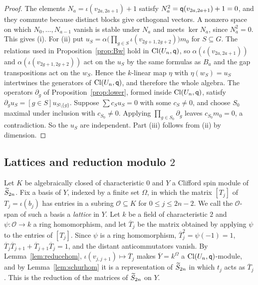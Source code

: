 \begin{proof}
The elements $N_a=\iota(v_{2a,2a+1})+1$ satisfy $N_a^2=\mathsf{q}(v_{2a,2a+1})+1=0$, and they commute because distinct blocks give orthogonal vectors. A nonzero space on which $N_0,\dots,N_{a-1}$ vanish is stable under $N_a$ and meets $\ker N_a$, since $N_a^2=0$. This gives (i). For (ii) put $u_S=\alpha\bigl(\prod_{g\in S}\iota(v_{2g+1,2g+2})\bigr)m_0$ for $S\subseteq G$. The relations used in Proposition~\ref{prop:Bw} hold in $\operatorname{Cl}(U_n,\mathsf{q})$, so $\alpha(\iota(v_{2a,2a+1}))$ and $\alpha(\iota(v_{2g+1,2g+2}))$ act on the $u_S$ by the same formulas as $B_a$ and the gap transpositions act on the $w_S$. Hence the $k$-linear map $\eta$ with $\eta(w_S)=u_S$ intertwines the generators of $\operatorname{Cl}(U_n,\mathsf{q})$, and therefore the whole algebra. The operators $\partial_g$ of Proposition~\ref{prop:lower}, formed inside $\operatorname{Cl}(U_n,\mathsf{q})$, satisfy $\partial_{g}u_S=[g\in S]u_{S\setminus\{g\}}$. Suppose $\sum c_{S}u_S=0$ with some $c_S\ne0$, and choose $S_0$ maximal under inclusion with $c_{S_0}\ne0$. Applying $\prod_{g\in S_0}\partial_g$ leaves $c_{S_0}m_0=0$, a contradiction. So the $u_S$ are independent. Part (iii) follows from (ii) by dimension.
\end{proof}

\subsection{Lattices and reduction modulo \texorpdfstring{$2$}{2}}\label{subsec:reduction}

Let $K$ be algebraically closed of characteristic $0$ and $Y$ a Clifford spin module of $\widetilde{S}_{2n}$. Fix a basis of $Y$, indexed by a finite set $\Omega$, in which the matrix $[T_j]$ of $T_j=\iota(b_j)$ has entries in a subring $\mathcal O\subseteq K$ for $0\le j\le2n-2$. We call the $\mathcal O$-span of such a basis a \emph{lattice} in $Y$. Let $k$ be a field of characteristic $2$ and $\psi\colon\mathcal O\to k$ a ring homomorphism, and let $\overline{T}_j$ be the matrix obtained by applying $\psi$ to the entries of $[T_j]$. Since $\psi$ is a ring homomorphism, $\overline{T}_j^2=\psi(-1)=1$, $\overline{T}_j\overline{T}_{j+1}+\overline{T}_{j+1}\overline{T}_j=1$, and the distant anticommutators vanish. By Lemma~\ref{lem:reducehom}, $\iota(v_{j,j+1})\mapsto\overline{T}_j$ makes $\overline{Y}=k^\Omega$ a $\operatorname{Cl}(U_n,\mathsf{q})$-module, and by Lemma~\ref{lem:schurhom} it is a representation of $\widetilde{S}_{2n}$ in which $t_j$ acts as $\overline{T}_j$. This is the reduction of the matrices of $\widetilde{S}_{2n}$ on $Y$.

